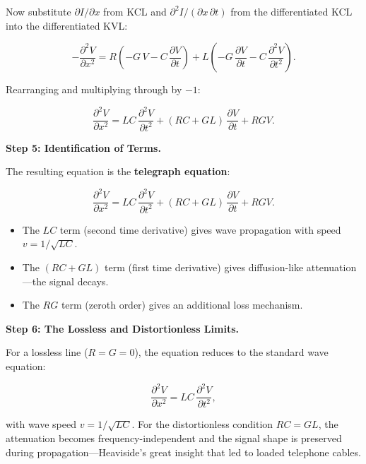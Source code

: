 Now substitute $\partial I/\partial x$ from KCL and $\partial^2 I / (\partial x\,\partial t)$ from the differentiated KCL into the differentiated KVL:

\begin{equation}
-\frac{\partial^2 V}{\partial x^2} = R\left(-G\,V - C\,\frac{\partial V}{\partial t}\right) + L\left(-G\,\frac{\partial V}{\partial t} - C\,\frac{\partial^2 V}{\partial t^2}\right).
\end{equation}

Rearranging and multiplying through by $-1$:

\begin{equation}
\frac{\partial^2 V}{\partial x^2} = LC\,\frac{\partial^2 V}{\partial t^2} + (RC + GL)\,\frac{\partial V}{\partial t} + RGV.
\end{equation}

\textbf{Step 5: Identification of Terms.}

The resulting equation is the \textbf{telegraph equation}:

\begin{equation}
\boxed{\frac{\partial^2 V}{\partial x^2} = LC\,\frac{\partial^2 V}{\partial t^2} + (RC + GL)\,\frac{\partial V}{\partial t} + RGV.}
\end{equation}

\begin{itemize}
\item The $LC$ term (second time derivative) gives wave propagation with speed $v = 1/\sqrt{LC}$.
\item The $(RC + GL)$ term (first time derivative) gives diffusion-like attenuation---the signal decays.
\item The $RG$ term (zeroth order) gives an additional loss mechanism.
\end{itemize}

\textbf{Step 6: The Lossless and Distortionless Limits.}

For a lossless line ($R = G = 0$), the equation reduces to the standard wave equation:

\begin{equation}
\frac{\partial^2 V}{\partial x^2} = LC\,\frac{\partial^2 V}{\partial t^2},
\end{equation}

with wave speed $v = 1/\sqrt{LC}$. For the distortionless condition $RC = GL$, the attenuation becomes frequency-independent and the signal shape is preserved during propagation---Heaviside's great insight that led to loaded telephone cables.

